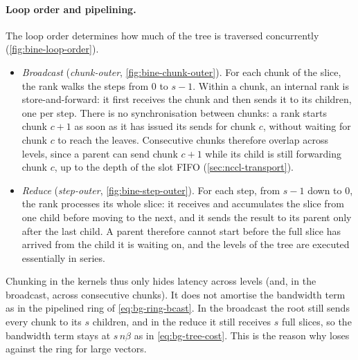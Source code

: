 \paragraph{Loop order and pipelining.}
The loop order determines how much of the tree is traversed concurrently
(\cref{fig:bine-loop-order}).
\begin{itemize}
  \item \emph{Broadcast} (\emph{chunk-outer}, \cref{fig:bine-chunk-outer}).
  For each chunk of the slice, the rank walks the steps from $0$ to $s-1$.
  Within a chunk, an internal rank is store-and-forward: it first receives the chunk and then sends it to its children, one per step.
  There is no synchronisation between chunks: a rank starts chunk $c+1$ as soon as it has issued its sends for chunk $c$, without waiting for chunk $c$ to reach the leaves.
  Consecutive chunks therefore overlap across levels, since a parent can send chunk $c+1$ while its child is still forwarding chunk $c$, up to the depth of the slot FIFO (\cref{sec:nccl-transport}).
  \item \emph{Reduce} (\emph{step-outer}, \cref{fig:bine-step-outer}).
  For each step, from $s-1$ down to $0$, the rank processes its whole slice: it receives and accumulates the slice from one child before moving to the next, and it sends the result to its parent only after the last child.
  A parent therefore cannot start before the full slice has arrived from the child it is waiting on, and the levels of the tree are executed essentially in series.
\end{itemize}
Chunking in the \bine{} kernels thus only hides latency across levels (and, in the broadcast, across consecutive chunks). It does not amortise the bandwidth term as in the pipelined ring of \cref{eq:bg-ring-bcast}.
In the broadcast the root still sends every chunk to its $s$ children, and in the reduce it still receives $s$ full slices, so the bandwidth term stays at $s\,n\beta$ as in \cref{eq:bg-tree-cost}.
This is the reason why \bine{} loses against the ring for large vectors.


